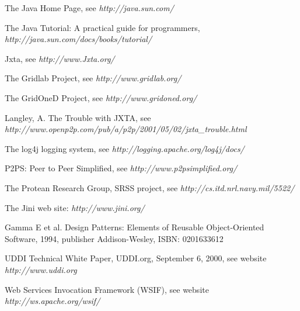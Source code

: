 \begin{thebibliography}{99.}
 The Java Home Page, see \emph{http://java.sun.com/}

  The Java Tutorial: A practical guide for programmers,
\emph{http://java.sun.com/docs/books/tutorial/}

 Jxta, see \emph{http://www.Jxta.org/}

 The Gridlab Project, see \emph{http://www.gridlab.org/}

 The GridOneD Project, see \emph{http://www.gridoned.org/}

  Langley, A.  The Trouble with JXTA,
see \emph{http://www.openp2p.com/pub/a/p2p/2001/05/02/jxta\_trouble.html}

 The log4j logging system, see \emph{http://logging.apache.org/log4j/docs/}

 P2PS: Peer to Peer Simplified, see 
\emph{http://www.p2psimplified.org/}

 The Protean Research Group, SRSS project, see 
\emph{http://cs.itd.nrl.navy.mil/5522/}

 The Jini web site: \emph{http://www.jini.org/}

  Gamma E et al. Design Patterns: Elements of Reusable Object-Oriented Software, 1994, publisher Addison-Wesley, ISBN: 0201633612

 UDDI Technical White Paper, UDDI.org, September 6, 2000, 
see website \emph{http://www.uddi.org}

 Web Services Invocation Framework ({WSIF}), see website 
\emph{http://ws.apache.org/wsif/}

\end{thebibliography}
